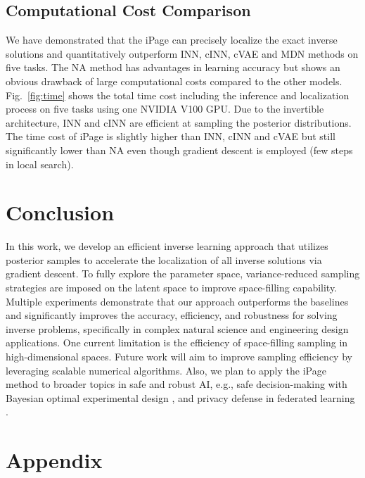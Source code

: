 \documentclass[letterpaper]{article} %
\begin{document}
\subsection{Computational Cost Comparison}
We have demonstrated that the iPage can precisely localize the exact inverse solutions and quantitatively outperform INN, cINN, cVAE and MDN methods on five tasks. The NA method has advantages in learning accuracy but shows an obvious drawback of large computational costs compared to the other models. Fig.~\ref{fig:time} shows the total time cost including the inference and localization process on five tasks using one NVIDIA V100 GPU. Due to the invertible architecture, INN and cINN are efficient at sampling the posterior distributions. The time cost of iPage is slightly higher than INN, cINN and cVAE but still significantly lower than NA even though gradient descent is employed (few steps in local search). 

\section{Conclusion}
In this work, we develop an efficient inverse learning approach that utilizes posterior samples to accelerate the localization of all inverse solutions via gradient descent. To fully explore the parameter space, variance-reduced sampling strategies are imposed on the latent space to improve space-filling capability. Multiple experiments demonstrate that our approach outperforms the baselines and significantly improves the accuracy, efficiency, and robustness for solving inverse  problems, specifically in complex natural science and engineering design applications.  One current limitation is the efficiency of space-filling sampling in high-dimensional spaces. 
Future work will aim to improve sampling efficiency by leveraging scalable numerical algorithms. Also, we plan to apply the iPage method to broader topics in safe and robust AI, e.g., safe decision-making with Bayesian optimal experimental design \cite{zhang2021scalable}, and privacy defense in federated learning \cite{li2022auditing}.  


% 
% 

\appendix
\section{Appendix}
\end{document}
